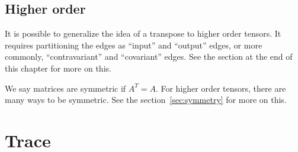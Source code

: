 \subsection{Higher order}
It is possible to generalize the idea of a transpose to higher order tensors.
It requires partitioning the edges as ``input'' and ``output'' edges, or more commonly, ``contravariant'' and ``covariant'' edges.
See the section at the end of this chapter for more on this.

We say matrices are symmetric if $A^T = A$.
For higher order tensors, there are many ways to be symmetric.
See the section~\ref{sec:symmetry} for more on this.

\section{Trace}

